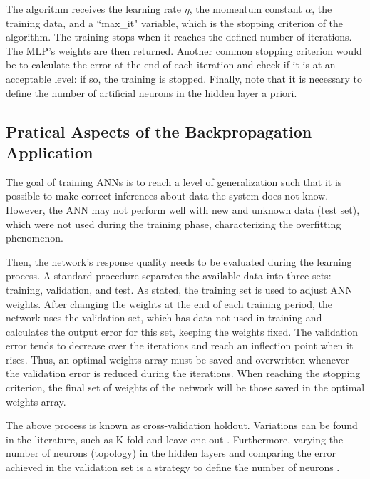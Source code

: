 
The algorithm receives the learning rate $\eta$, the momentum constant $\alpha$, the training data, and a ``max\_it" variable, which is the stopping criterion of the algorithm. The training stops when it reaches the defined number of iterations. The MLP's weights are then returned. Another common stopping criterion would be to calculate the error at the end of each iteration and check if it is at an acceptable level: if so, the training is stopped. Finally, note that it is necessary to define the number of artificial neurons in the hidden layer a priori.

\subsection{Pratical Aspects of the Backpropagation Application}
\label{ssec:Pratical}

The goal of training ANNs is to reach a level of generalization such that it is possible to make correct inferences about data the system does not know. However, the ANN may not perform well with new and unknown data (test set), which were not used during the training phase, characterizing the overfitting phenomenon.

Then, the network's response quality needs to be evaluated during the learning process. A standard procedure separates the available data into three sets: training, validation, and test. As stated, the training set is used to adjust ANN weights. After changing the weights at the end of each training period, the network uses the validation set, which has data not used in training and calculates the output error for this set, keeping the weights fixed. The validation error tends to decrease over the iterations and reach an inflection point when it rises. Thus, an optimal weights array must be saved and overwritten whenever the validation error is reduced during the iterations. When reaching the stopping criterion, the final set of weights of the network will be those saved in the optimal weights array.

The above process is known as cross-validation holdout. Variations can be found in the literature, such as K-fold and leave-one-out \cite{haykin, Castro2006FundamentalsON}. Furthermore, varying the number of neurons (topology) in the hidden layers and comparing the error achieved in the validation set is a strategy to define the number of neurons \cite{James2013}.

